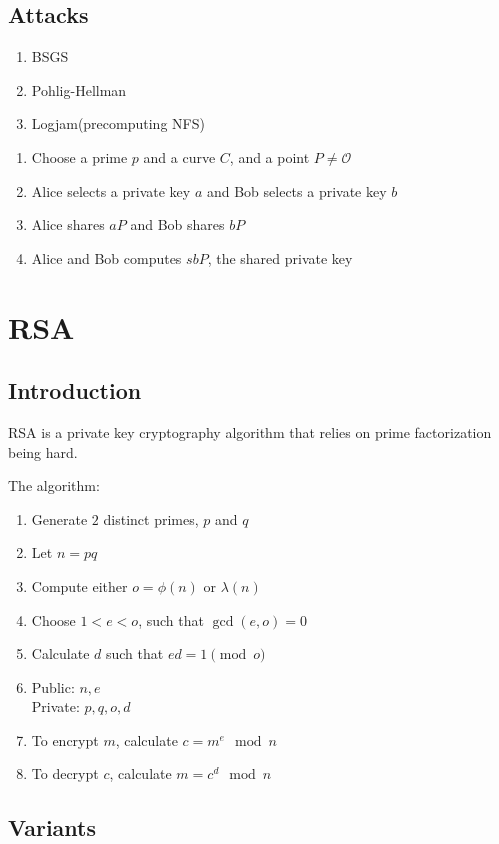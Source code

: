 \documentclass{report}
\begin{document}
\section{Attacks}

\begin{enumerate}
	\item BSGS
	\item Pohlig-Hellman
	\item Logjam(precomputing NFS)
\end{enumerate}

\begin{enumerate}
	\item Choose a prime $p$ and a curve $C$, and a point $P\neq\mathcal{O}$
	\item Alice selects a private key $a$ and Bob selects a private key $b$
	\item Alice shares $aP$ and Bob shares $bP$
	\item Alice and Bob computes $sbP$, the shared private key
\end{enumerate}

\chapter{RSA}
\section{Introduction}

RSA is a private key cryptography algorithm that relies on prime factorization being hard.

The algorithm:

\begin{enumerate}
	\item Generate $2$ distinct primes, $p$ and $q$
	\item Let $n=pq$
	\item Compute either $o=\phi(n)$ or $\lambda(n)$
	\item Choose $1<e<o$, such that $\gcd(e,o)=0$
	\item Calculate $d$ such that $ed=1\pmod o$
	\item Public: $n,e$\\Private: $p,q,o,d$
	\item To encrypt $m$, calculate $c=m^e\mod n$
	\item To decrypt $c$, calculate $m=c^d\mod n$
\end{enumerate}

\section{Variants}
\end{document}
